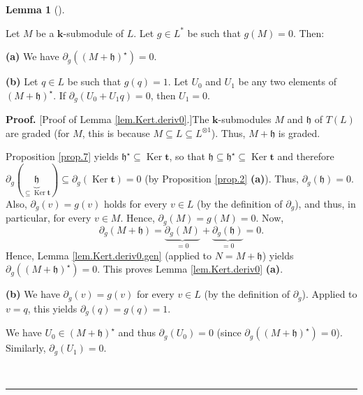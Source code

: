 \documentclass[numbers=enddot,12pt,final,onecolumn,notitlepage]{scrartcl}%
\theoremstyle{definition}
\newtheorem{lem}[theo]{Lemma}
\newenvironment{lemma}[1][]
{\begin{lem}[#1]\begin{leftbar}}
{\end{leftbar}\end{lem}}
\newenvironment{proof}[1][Proof]{\noindent\textbf{#1.} }{\ \rule{0.5em}{0.5em}}
\begin{document}
\begin{lemma}
\label{lem.Kert.deriv0}Let $M$ be a $\mathbf{k}$-submodule of $L$. Let $g\in
L^{\ast}$ be such that $g\left(  M\right)  =0$. Then: \medskip

\textbf{(a)} We have $\partial_{g}\left(  \left(  M+\mathfrak{h}\right)
^{\star}\right)  =0$. \medskip

\textbf{(b)} Let $q\in L$ be such that $g\left(  q\right)  =1$. Let $U_{0}$
and $U_{1}$ be any two elements of $\left(  M+\mathfrak{h}\right)  ^{\star}$.
If $\partial_{g}\left(  U_{0}+U_{1}q\right)  =0$, then $U_{1}=0$.
\end{lemma}

\begin{proof}
[Proof of Lemma \ref{lem.Kert.deriv0}.]The $\mathbf{k}$-submodules $M$ and
$\mathfrak{h}$ of $T\left(  L\right)  $ are graded (for $M$, this is because
$M\subseteq L\subseteq L^{\otimes1}$). Thus, $M+\mathfrak{h}$ is graded.

Proposition \ref{prop.7} yields $\mathfrak{h}^{\star}\subseteq
\operatorname*{Ker}\mathbf{t}$, so that $\mathfrak{h}\subseteq\mathfrak{h}%
^{\star}\subseteq\operatorname*{Ker}\mathbf{t}$ and therefore $\partial
_{g}\left(  \underbrace{\mathfrak{h}}_{\subseteq\operatorname*{Ker}\mathbf{t}%
}\right)  \subseteq\partial_{g}\left(  \operatorname*{Ker}\mathbf{t}\right)
=0$ (by Proposition \ref{prop.2} \textbf{(a)}). Thus, $\partial_{g}\left(
\mathfrak{h}\right)  =0$. Also, $\partial_{g}\left(  v\right)  =g\left(
v\right)  $ holds for every $v\in L$ (by the definition of $\partial_{g}$),
and thus, in particular, for every $v\in M$. Hence, $\partial_{g}\left(
M\right)  =g\left(  M\right)  =0$. Now,
\[
\partial_{g}\left(  M+\mathfrak{h}\right)  =\underbrace{\partial_{g}\left(
M\right)  }_{=0}+\underbrace{\partial_{g}\left(  \mathfrak{h}\right)  }%
_{=0}=0.
\]
Hence, Lemma \ref{lem.Kert.deriv0.gen} (applied to $N=M+\mathfrak{h}$) yields
$\partial_{g}\left(  \left(  M+\mathfrak{h}\right)  ^{\star}\right)  =0$. This
proves Lemma \ref{lem.Kert.deriv0} \textbf{(a)}. \medskip

\textbf{(b)} We have $\partial_{g}\left(  v\right)  =g\left(  v\right)  $ for
every $v\in L$ (by the definition of $\partial_{g}$). Applied to $v=q$, this
yields $\partial_{g}\left(  q\right)  =g\left(  q\right)  =1$.

We have $U_{0} \in\left(  M+\mathfrak{h}\right)  ^{\star}$ and thus
$\partial_{g}\left(  U_{0}\right)  = 0$ (since $\partial_{g}\left(  \left(  M
+ \mathfrak{h}\right)  ^{\star}\right)  = 0$). Similarly, $\partial_{g}\left(
U_{1}\right)  = 0$.


\end{proof}
\end{document}
